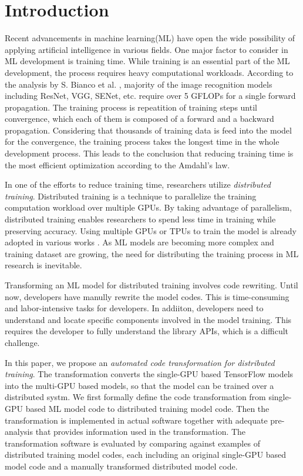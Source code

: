 \section{Introduction}\label{sec:intro}

Recent advancements in machine learning(ML) have open the wide possibility of
applying artificial intelligence in various fields.
One major factor to consider in ML development is training time.
While training is an essential part of the ML development,
the process requires heavy computational workloads.
According to the analysis by S. Bianco et al. \cite{bianco2018benchmark},
majority of the image recognition models including ResNet, VGG, SENet, etc.
require over 5 GFLOPs for a single forward propagation.
The training process is repeatition of training steps until convergence,
which each of them is composed of a forward and a backward propagation.
Considering that thousands of training data is feed into the model
for the convergence, the training process takes the longest time
in the whole development process. This leads to the conclusion that
reducing training time is the most efficient optimization according to
the Amdahl's law.

In one of the efforts to reduce training time, 
researchers utilize \textit{distributed training}.
Distributed training is a technique to parallelize the training computation
workload over multiple GPUs.
By taking advantage of parallelism, distributed training enables researchers
to spend less time in training while preserving accuracy.
Using multiple GPUs or TPUs to train the model is already adopted
in various works \cite{brown2020gpt-3} \cite{silver2017alphazero}
\cite{zhang2019distrspeech} \cite{tian2020distrwebattack}.
As ML models are becoming more complex and training dataset are growing,
the need for distributing the training process in ML research is inevitable.

Transforming an ML model for distributed training involves code rewriting.
Until now, developers have manully rewrite the model codes.
This is time-consuming and labor-intensive tasks for developers.
In addiiton, developers need to understand and locate 
specific components involved in the model training.
This requires the developer to fully understand the library APIs,
which is a difficult challenge.

In this paper, we propose an 
\textit{automated code transformation for distributed training}.
The transformation
converts the single-GPU based TensorFlow models
into the multi-GPU based models, so that the model can be trained
over a distributed systm.
We first formally define the code transformation from
single-GPU based ML model code to distributed training model code.
Then the transformation is implemented in actual software together with
adequate pre-analysis that provides information used in the transformation.
The transformation software is evaluated by comparing against 
examples of distributed training model codes, 
each including an original single-GPU based model code 
and a manually transformed distributed model code.

